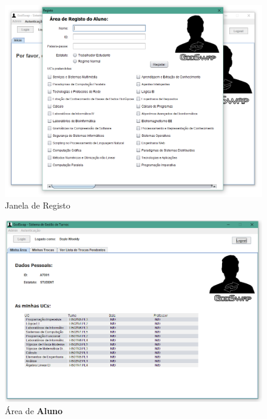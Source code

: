 \documentclass[a4paper]{article}
\begin{document}
\begin{figure}[H]
\centering
\includegraphics[width=13.5cm]{IRegisto}
\caption{Janela de Registo}
\label{}
\end{figure}

\begin{figure}[H]
\centering
\includegraphics[width=13.5cm]{IMinhaAreaALUNO}
\caption{Área de \textbf{Aluno}}
\label{}
\end{figure}
\end{document}
